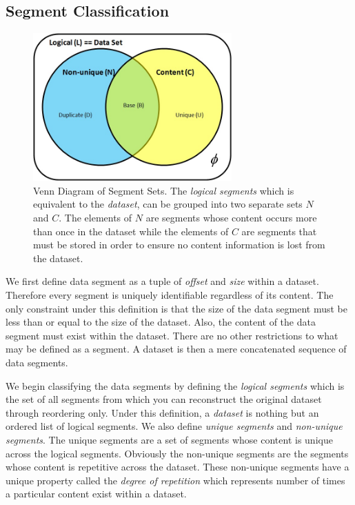 \subsection{Segment Classification}

\begin{figure}[!t]
\centering
\includegraphics[width=3in]{figure/dedup/seg_classification.jpg}
\captionsetup{format=myformat}
\caption{Venn Diagram of Segment Sets. The \emph{logical segments} which is equivalent to the \emph{dataset}, can be grouped into two separate sets $N$ and $C$. The elements of $N$ are segments whose content occurs more than once in the dataset while the elements of $C$ are segments that must be stored in order to ensure no content information is lost from the dataset.}
\label{seg_class}
\end{figure}

We first define data segment as a tuple of \emph{offset} and \emph{size} within a dataset. Therefore every segment is uniquely identifiable regardless of its content. The only constraint under this definition is that the size of the data segment must be less than or equal to the size of the dataset. Also, the content of the data segment must exist within the dataset. There are no other restrictions to what may be defined as a segment. A dataset is then a mere concatenated sequence of data segments.

We begin classifying the data segments by defining the \emph{logical segments} which is the set of all segments from which you can reconstruct the original dataset through reordering only. Under this definition, a \emph{dataset} is nothing but an ordered list of logical segments. We also define \emph{unique segments} and \emph{non-unique segments}. The unique segments are a set of segments whose content is unique across the logical segments. Obviously the non-unique segments are the segments whose content is repetitive across the dataset. These non-unique segments have a unique property called the \emph{degree of repetition} which represents number of  times a particular content exist within a dataset.

